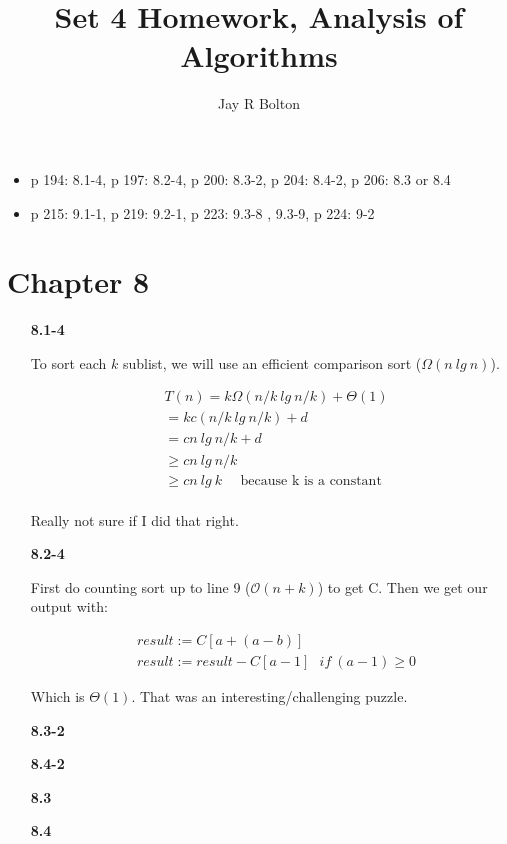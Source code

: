 \documentclass{article}
\title{Set 4 Homework, Analysis of Algorithms}
\author{Jay R Bolton}
\begin{document}
\maketitle

\begin{itemize}
\item p 194: 8.1-4, p 197: 8.2-4, p 200: 8.3-2, p 204: 8.4-2, p 206: 8.3 or 8.4
\item p 215: 9.1-1, p 219: 9.2-1, p 223: 9.3-8 , 9.3-9, p 224: 9-2 
\end{itemize}

\section*{Chapter 8}

\begin{enumerate}

\item[\textbf{8.1-4}]

To sort each $k$ sublist, we will use an efficient comparison sort ($\Omega(n\ lg\ n)$). 

\begin{align*}
& T(n) = k\Omega(n/k\ lg\ n/k) + \Theta(1) \\
& = kc(n/k\ lg\ n/k) + d \\
& = cn\ lg\ n/k + d \\
& \geq cn\ lg\ n/k \\
& \geq cn\ lg\ k \ \ \ \ \ \ \text{because k is a constant} \\
\end{align*}

Really not sure if I did that right.

\item[\textbf{8.2-4}]

First do counting sort up to line 9 ($\mathcal{O}(n + k)$) to get C. Then we get our output with:

\begin{align*}
& result := C[a + (a-b)] \\
& result := result - C[a-1]\ \ \ if\ (a-1) \geq 0
\end{align*}

Which is $\Theta(1)$. That was an interesting/challenging puzzle.

\item[\textbf{8.3-2}]

\item[\textbf{8.4-2}]

\item[\textbf{8.3}]

\item[\textbf{8.4}]

\end{enumerate}
\end{document}
